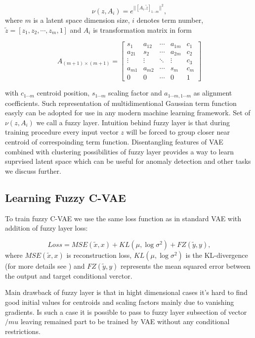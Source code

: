 \documentclass[runningheads]{llncs}
\begin{document}
\[ 
   \nu(z, A_i) = e^{|| [A_i . \tilde{z}]_{1 \cdots m} ||^2},
\]
where $m$ is a latent space dimension size, $i$ denotes term number, $\tilde{z} = [z_1, z_2, \cdots, z_m, 1]$ and $A_i$ is transformation matrix in form 

\[ 
    A_{(m+1) \times (m+1)}= 
    \begin{bmatrix}
        s_{1} & a_{12} & \cdots & a_{1m} & c_{1}\\
        a_{21} & s_{2} & \cdots & a_{2m} & c_{2}\\
        \vdots & \vdots & \ddots & \vdots & c_{3}\\
        a_{m1} & a_{m2} & \cdots & s_{m} & c_{m}\\
        0 & 0 & \cdots & 0 & 1
    \end{bmatrix} 
\]

with $c_{1\cdots m}$ centroid position, $s_{1\cdots m}$ scaling factor and $a_{1\cdots m, 1\cdots m}$ as alignment coefficients.
Such representation of multidimentional Gaussian term function easyly can be adopted for use in any modern machine learning framework.
Set of $\nu(z, A_i)$ we call a fuzzy layer.
Intuition behind fuzzy layer is that during training procedure every input vector $z$ will be forced to group closer near centroid of correspoinding term function.
Disentangling features of VAE combined with clustering possibilities of fuzzy layer provides a way to learn suprvised latent space which can be useful for anomaly detection and other tasks we discuss further.

\subsection{Learning Fuzzy C-VAE}

To train fuzzy C-VAE we use the same loss function as in standard VAE with addition of fuzzy layer loss:

\[
    Loss = MSE(\tilde{x}, x) + KL(\mu, \log{\sigma^2}) + FZ(\tilde{y}, y),
\]
where $MSE(\tilde{x}, x)$ is reconstruction loss, $KL(\mu, \log{\sigma^2})$ is the KL-divergence (for more details see \cite{kingma2022autoencoding}) and $FZ(\tilde{y}, y)$ represents the mean squared error between the output and target conditional verctor.

Main drawback of fuzzy layer is that in hight dimensional cases it's hard to find good initial values for centroids and scaling factors mainly due to vanishing gradients.
Is such a case it is possible to pass to fuzzy layer subsection of vector $/mu$ leaving remained part to be trained by VAE without any conditional restrictions. 
\end{document}
